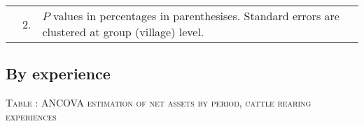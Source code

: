 \begin{minipage}[t]{14cm}
\begin{tabular}{>{\hfill\scriptsize}p{1cm}<{}>{\hfill\scriptsize}p{.25cm}<{}>{\scriptsize}p{12cm}<{\hfill}}
& 2. & $P$ values in percentages in parenthesises. Standard errors are clustered at group (village) level.
\end{tabular}
\end{minipage}

\subsection{By experience}




\vspace{-1cm}\hspace{-1cm}\begin{minipage}[t]{14cm}
\hfil\textsc{\normalsize Table \thetable: ANCOVA estimation of net assets by period, cattle rearing experiences\label{tab ANCOVA narrow net assets Experience timevarying 1}}\\
\setlength{\tabcolsep}{1pt}
\setlength{\baselineskip}{8pt}
\renewcommand{\arraystretch}{.52}
\hfil{}
\end{minipage}

